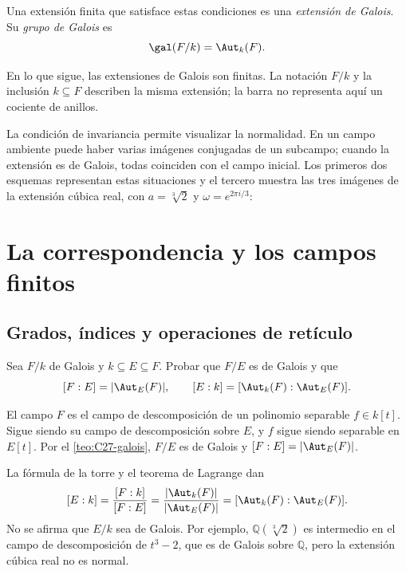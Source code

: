 \begin{defi}
Una extensión finita que satisface estas condiciones es una \emph{extensión de Galois}. Su \emph{grupo de Galois} es
\[
\gal(F/k)=\Aut_k(F).
\]
\end{defi}
En lo que sigue, las extensiones de Galois son finitas. La notación $F/k$ y la inclusión $k\subseteq F$ describen la misma extensión; la barra no representa aquí un cociente de anillos.

La condición de invariancia permite visualizar la normalidad. En un campo ambiente puede haber varias imágenes conjugadas de un subcampo; cuando la extensión es de Galois, todas coinciden con el campo inicial. Los primeros dos esquemas representan estas situaciones y el tercero muestra las tres imágenes de la extensión cúbica real, con $a=\sqrt[3]{2}$ y $\omega=e^{2\pi i/3}$:


\section{La correspondencia y los campos finitos}
\subsection{Grados, índices y operaciones de retículo}
\begin{ejer}\label{ejer:C27-intermedio}
Sea $F/k$ de Galois y $k\subseteq E\subseteq F$. Probar que $F/E$ es de Galois y que
\[
[F:E]=|\Aut_E(F)|,\qquad
[E:k]=[\Aut_k(F):\Aut_E(F)].
\]
\end{ejer}
\begin{sol}
El campo $F$ es el campo de descomposición de un polinomio separable $f\in k[t]$. Sigue siendo su campo de descomposición sobre $E$, y $f$ sigue siendo separable en $E[t]$. Por el \cref{teo:C27-galois}, $F/E$ es de Galois y $[F:E]=|\Aut_E(F)|$.

La fórmula de la torre y el teorema de Lagrange dan
\[
[E:k]=\frac{[F:k]}{[F:E]}
=\frac{|\Aut_k(F)|}{|\Aut_E(F)|}
=[\Aut_k(F):\Aut_E(F)].
\]
No se afirma que $E/k$ sea de Galois. Por ejemplo, $\mathbb Q(\sqrt[3]{2})$ es intermedio en el campo de descomposición de $t^3-2$, que es de Galois sobre $\mathbb Q$, pero la extensión cúbica real no es normal.
\end{sol}

